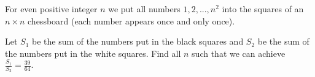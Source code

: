 For even positive integer $n$ we put all numbers $1,2,...,n^2$ into the squares of an $n\times n$ chessboard (each number appears once and only once).

Let $S_1$ be the sum of the numbers put in the black squares and $S_2$ be the sum of the numbers put in the white squares. Find all $n$ such that we can achieve $\frac{S_1}{S_2}=\frac{39}{64}.$